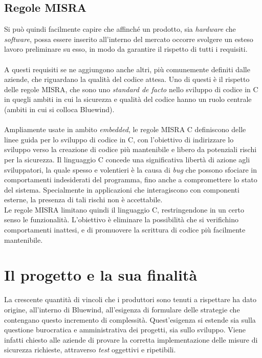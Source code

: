\subsection{Regole MISRA}
\noindent
Si può quindi facilmente capire che affinché un prodotto, sia \textit{hardware} che \textit{software}, possa essere inserito all'interno del mercato occorre svolgere un esteso lavoro preliminare su esso, in modo da garantire il rispetto di tutti i requisiti.\\\\
A questi requisiti se ne aggiungono anche altri, più comunemente definiti dalle aziende, che riguardano la qualità del codice attesa.
Uno di questi è il rispetto delle regole MISRA, che sono uno \textit{standard de facto} nello sviluppo di codice in C in quegli ambiti in cui la sicurezza e qualità del codice hanno un ruolo centrale (ambiti in cui si colloca Bluewind).\\\\
Ampliamente usate in ambito \textit{embedded}, le regole MISRA C definiscono delle linee guida per lo sviluppo di codice in C, con l'obiettivo di indirizzare lo sviluppo verso la creazione di codice più mantenibile e libero da potenziali rischi per la sicurezza.
Il linguaggio C concede una significativa libertà di azione agli sviluppatori, la quale spesso e volentieri è la causa di \textit{bug} che possono sfociare in comportamenti indesiderati del programma, fino anche a compromettere lo stato del sistema.
Specialmente in applicazioni che interagiscono con componenti esterne, la presenza di tali rischi non è accettabile.
\\
Le regole MISRA limitano quindi il linguaggio C, restringendone in un certo senso le funzionalità.
L'obiettivo è eliminare la possibilità che si verifichino comportamenti inattesi, e di promuovere la scrittura di codice più facilmente mantenibile.




\section{Il progetto e la sua finalità}
\noindent
La crescente quantità di vincoli che i produttori sono tenuti a rispettare ha dato origine, all'interno di Bluewind, all'esigenza di formulare delle strategie che contengano questo incremento di complessità.
Quest'esigenza si estende sia sulla questione burocratica e amministrativa dei progetti, sia sullo sviluppo.
Viene infatti chiesto alle aziende di provare la corretta implementazione delle misure di sicurezza richieste, attraverso \textit{test} oggettivi e ripetibili.\\

